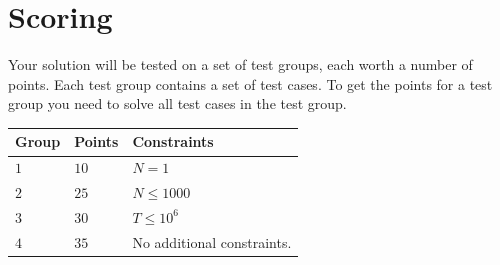 \section*{Scoring}
Your solution will be tested on a set of test groups, each worth a number of points. Each test group contains
a set of test cases. To get the points for a test group you need to solve all test cases in the test group.

\noindent
\begin{tabular}{| l | l | p{12cm} |}
  \hline
  \textbf{Group} & \textbf{Points} & \textbf{Constraints} \\ \hline
  $1$    & $10$       & $N=1$ \\ \hline
  $2$    & $25$       & $N \leq 1000$ \\ \hline
  $3$    & $30$       & $T \leq 10^6$ \\ \hline
  $4$    & $35$       & No additional constraints. \\ \hline
\end{tabular}

